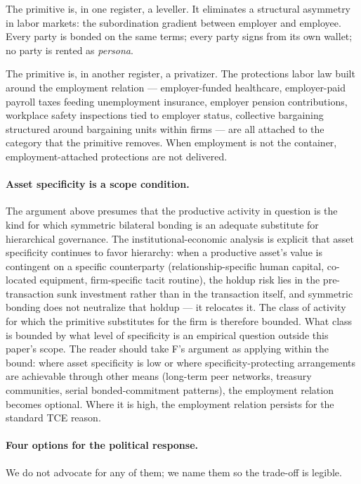 \documentclass[11pt,a4paper]{article}
\theoremstyle{remark}
\begin{document}
The primitive is, in one register, a leveller. It eliminates a
structural asymmetry in labor markets: the subordination gradient
between employer and employee. Every party is bonded on the same
terms; every party signs from its own wallet; no party is rented
as \emph{persona}.

The primitive is, in another register, a privatizer. The protections
labor law built around the employment relation --- employer-funded
healthcare, employer-paid payroll taxes feeding unemployment
insurance, employer pension contributions, workplace safety
inspections tied to employer status, collective bargaining
structured around bargaining units within firms --- are all
attached to the category that the primitive removes. When
employment is not the container, employment-attached protections
are not delivered.

\paragraph{Asset specificity is a scope condition.}
The argument above presumes that the productive activity in
question is the kind for which symmetric bilateral bonding is an
adequate substitute for hierarchical governance. The
institutional-economic analysis is explicit that asset
specificity continues to favor hierarchy:
when a productive asset's value is contingent on a specific
counterparty (relationship-specific human capital, co-located
equipment, firm-specific tacit routine), the holdup risk lies in
the pre-transaction sunk investment rather than in the
transaction itself, and symmetric bonding does not neutralize
that holdup --- it relocates it. The class of activity for which
the primitive substitutes for the firm is therefore bounded.
What class is bounded by what level of specificity is an
empirical question outside this paper's scope. The reader should
take F's argument as applying within the bound: where asset
specificity is low or where specificity-protecting arrangements
are achievable through other means (long-term peer networks,
treasury communities, serial bonded-commitment patterns), the
employment relation becomes optional. Where it is high, the
employment relation persists for the standard TCE reason.

\paragraph{Four options for the political response.}
We do not advocate for any of them; we name them so the trade-off
is legible.
\end{document}
